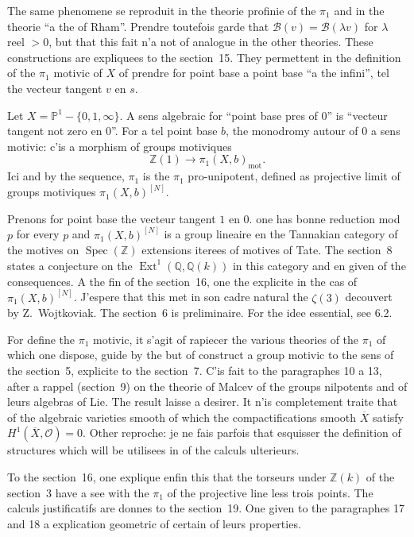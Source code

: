 \documentclass[12pt,a4paper]{article}
\theoremstyle{plain}
\theoremstyle{definition}
\theoremstyle{remark}
\DeclareMathOperator{\Spec}{Spec}
\DeclareMathOperator{\Ext}{Ext}
\newcommand{\mot}{\mathrm{mot}}
\providecommand{\Ext}{\operatorname{Ext}}
\providecommand{\Spec}{\operatorname{Spec}}
\providecommand{\mot}{\mathrm{mot}}
\begin{document}
The same phenomene se reproduit in the theorie profinie of the $\pi_1$ and in the
theorie ``a the of Rham''. Prendre toutefois garde that $\mathcal{B}(v) = \mathcal{B}(\lambda v)$
for $\lambda$ reel $> 0$, but that this fait n'a not of analogue in the other theories.
These constructions are expliquees to the section~15. They permettent in the definition
of the $\pi_1$ motivic of $X$ of prendre for point base a point base ``a the infini'', tel
the vecteur tangent $v$ en $s$.

Let $X = \mathbb{P}^1 - \{0, 1, \infty\}$. A sens algebraic for ``point base pres of
$0$'' is ``vecteur tangent not zero en $0$''. For a tel point base $b$, the monodromy
autour of $0$ a sens motivic: c'is a morphism of groups motiviques
\[
\mathbb{Z}(1) \longrightarrow \pi_1(X,b)_{\mot}.
\]
Ici and by the sequence, $\pi_1$ is the $\pi_1$ pro-unipotent, defined as projective limit
of groups motiviques $\pi_1(X,b)^{[N]}$.

Prenons for point base the vecteur tangent $1$ en $0$. one has bonne reduction mod $p$
for every $p$ and $\pi_1(X,b)^{[N]}$ is a group lineaire en the Tannakian category of the
motives on $\Spec(\mathbb{Z})$ extensions iterees of motives of Tate. The section~8
states a conjecture on the $\Ext^1(\mathbb{Q}, \mathbb{Q}(k))$ in this category and en
given of the consequences. A the fin of the section~16, one the explicite in the cas of
$\pi_1(X,b)^{[N]}$. J'espere that this met in son cadre natural the $\zeta(3)$ decouvert
by Z.~Wojtkoviak. The section~6 is preliminaire. For the idee essential, see 6.2.

For define the $\pi_1$ motivic, it s'agit of rapiecer the various theories of the $\pi_1$
of which one dispose, guide by the but of construct a group motivic to the sens of the section~5,
explicite to the section~7. C'is fait to the paragraphes 10 a 13, after a rappel
(section~9) on the theorie of Malcev of the groups nilpotents and of leurs algebras of
Lie. The result laisse a desirer. It n'is completement traite that of the algebraic varieties smooth of which the compactifications smooth $\overline{X}$ satisfy
$H^1(\overline{X}, \mathcal{O}) = 0$. Other reproche: je ne fais parfois that esquisser the
definition of structures which will be utilisees in of the calculs ulterieurs.

To the section~16, one explique enfin this that the torseurs under $\mathbb{Z}(k)$ of the
section~3 have a see with the $\pi_1$ of the projective line less trois points. The
calculs justificatifs are donnes to the section~19. One given to the paragraphes 17 and 18
a explication geometric of certain of leurs properties.
\end{document}
